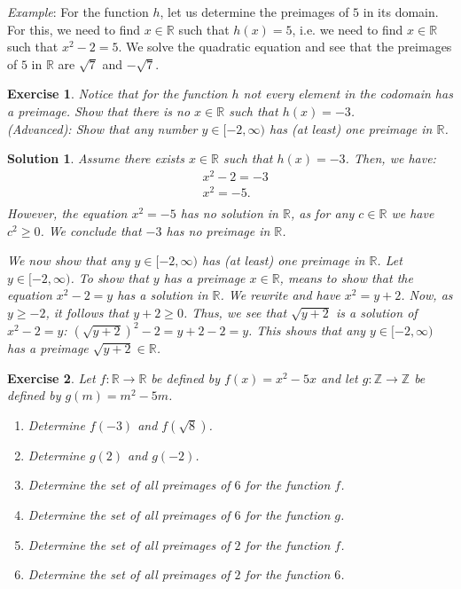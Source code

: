 \documentclass[12pt]{article}
\newtheorem{ex}{Exercise}[section]
\newtheorem{sol}[prop]{Solution}
\begin{document}
\textit{Example}: For the function $h$, let us determine the preimages of $5$ in its domain. For this, we need to find $x\in \mathbb{R}$ such that $h(x)=5$, i.e. we need to find $x\in \mathbb{R}$ such that $x^{2}-2=5$. We solve the quadratic equation and see that the preimages of $5$ in $\mathbb{R}$ are $\sqrt{7}$ and $-\sqrt{7}$.

\begin{ex}
Notice that for the function $h$ not every element in the codomain has a preimage. Show that there is no $x\in \mathbb{R}$ such that $h(x)=-3$. \\
(Advanced): Show that any number $y\in [-2, \infty)$ has (at least) one preimage in $\mathbb{R}$.
\end{ex}

\begin{sol}
Assume there exists $x\in \mathbb{R}$ such that $h(x)=-3$. Then, we have:
\begin{equation*}
\begin{split}
& x^{2}-2=-3\\
& x^{2}=-5.\\
\end{split}
\end{equation*}
However, the equation $x^{2}=-5$ has no solution in $\mathbb{R}$, as for any $c\in \mathbb{R}$ we have $c^{2}\geq 0$. We conclude that $-3$ has no preimage in $\mathbb{R}$.

We now show that any $y\in [-2, \infty)$ has (at least) one preimage in $\mathbb{R}$. Let $y\in [-2, \infty)$. To show that $y$ has a preimage $x\in \mathbb{R}$, means to show that the equation $x^{2}-2=y$ has a solution in $\mathbb{R}$. We rewrite and have $x^{2}=y+2$. Now, as $y\geq -2$, it follows that $y+2\geq 0$. Thus, we see that $\sqrt{y+2}$ is a solution of $x^{2}-2=y$: $(\sqrt{y+2})^{2}-2=y+2-2=y$. This shows that any $y\in [-2, \infty)$ has a preimage $\sqrt{y+2}\in \mathbb{R}$.
\end{sol}

\begin{ex}
Let $f:\mathbb{R}\to \mathbb{R}$ be defined by $f(x)=x^{2}-5x$ and let $g:\mathbb{Z}\to \mathbb{Z}$ be defined by  $g(m)=m^{2}-5m$.
\begin{enumerate}
\item[a)] Determine $f(-3)$ and $f(\sqrt{8})$.
\item[b)] Determine $g(2)$ and $g(-2)$.
\item[c)] Determine the set of all preimages of $6$ for the function $f$. 
\item[d)] Determine the set of all preimages of $6$ for the function $g$. 
\item[e)] Determine the set of all preimages of $2$ for the function $f$. 
\item[f)] Determine the set of all preimages of $2$ for the function $6$. 
\end{enumerate}
\end{ex}
\end{document}
